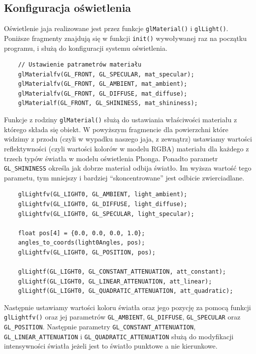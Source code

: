 \documentclass[a4paper]{article}
\begin{document}
\subsection{Konfiguracja oświetlenia}

Oświetlenie jaja realizowane jest przez funkcje \texttt{glMaterial()} i
\texttt{glLight()}. Poniższe fragmenty znajdują się w funkcji
\verb|init()| wywoływanej raz na początku programu, i służą do konfiguracji
systemu oświetlenia.

\begin{verbatim}
    // Ustawienie patrametrów materiału
    glMaterialfv(GL_FRONT, GL_SPECULAR, mat_specular);
    glMaterialfv(GL_FRONT, GL_AMBIENT, mat_ambient);
    glMaterialfv(GL_FRONT, GL_DIFFUSE, mat_diffuse);
    glMaterialf(GL_FRONT, GL_SHININESS, mat_shininess);
\end{verbatim}

Funkcje z rodziny \texttt{glMaterial()} służą do ustawiania właściwości
materiału z którego składa się obiekt. W powyższym fragmencie dla powierzchni
które widzimy z przodu (czyli w wypadku naszego jaja, z zewnątrz) ustawiamy
wartości reflektywności (czyli wartości kolorów w modelu RGBA) materiału dla
każdego z trzech typów światła w modelu oświetlenia Phonga. Ponadto parametr
\texttt{GL_SHININESS} określa jak dobrze materiał odbija światło. Im
wyższa wartość tego parametu, tym mniejszy i bardziej ``skoncentrowane'' jest
odbicie zwierciadlane.

\begin{verbatim}
    glLightfv(GL_LIGHT0, GL_AMBIENT, light_ambient);
    glLightfv(GL_LIGHT0, GL_DIFFUSE, light_diffuse);
    glLightfv(GL_LIGHT0, GL_SPECULAR, light_specular);

    float pos[4] = {0.0, 0.0, 0.0, 1.0};
    angles_to_coords(light0Angles, pos);
    glLightfv(GL_LIGHT0, GL_POSITION, pos);

    glLightf(GL_LIGHT0, GL_CONSTANT_ATTENUATION, att_constant);
    glLightf(GL_LIGHT0, GL_LINEAR_ATTENUATION, att_linear);
    glLightf(GL_LIGHT0, GL_QUADRATIC_ATTENUATION, att_quadratic);
\end{verbatim}

Następnie ustawiamy wartości koloru światła oraz jego pozycję za pomocą funkcji
\texttt{glLightfv()} oraz jej parametrów \verb|GL_AMBIENT|,
\verb|GL_DIFFUSE|, \verb|GL_SPECULAR| oraz \verb|GL_POSITION|. Następnie
parametry \verb|GL_CONSTANT_ATTENUATION|, \verb|GL_LINEAR_ATTENUATION| i
\verb|GL_QUADRATIC_ATTENUATION| służą do modyfikacji intensywności światła
jeżeli jest to światło punktowe a nie kierunkowe.
\end{document}
